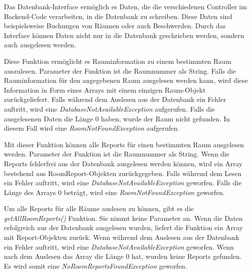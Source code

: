 

Das Datenbank-Interface ermöglich es Daten, die die verschiedenen Controller im Backend-Code verarbeiten, in die Datenbank zu schreiben. Diese Daten sind beispielsweise Buchungen von Räumen oder auch Beschwerden. Durch das Interface können Daten nicht nur in die Datenbank geschrieben werden, sondern auch ausgelesen werden.



Diese Funktion ermöglicht es Rauminformation zu einem bestimmten Raum auszulesen. Parameter der Funktion ist die Raumnummer als String. Falls die Rauminformation für den angegebenen Raum ausgelesen werden kann, wird diese Information in Form eines Arrays mit einem einzigen Raum-Objekt zurückgeliefert. Falls während dem Auslesen aus der Datenbank ein Fehler auftritt, wird eine \emph{DatabaseNotAvailableException} aufgerufen. Falls die ausgelesenen Daten die Länge 0 haben, wurde der Raum nicht gefunden. In diesem Fall wird eine \emph{RoomNotFoundException} aufgerufen.



Mit dieser Funktion können alle Reports für einen bestimmten Raum ausgelesen werden. Parameter der Funktion ist die Raumnummer als String. Wenn die Reports fehlerfrei aus der Datenbank ausgelesen werden können, wird ein Array bestehend aus RoomReport-Objekten zurückgegeben. Falls während dem Lesen ein Fehler auftritt, wird eine \emph{DatabaseNotAvailableException} geworfen. Falls die Länge des Arrays 0 beträgt, wird eine \emph{RoomNotFoundException} geworfen.


Um alle Reports für alle Räume auslesen zu können, gibt es die \emph{getAllRoomReports()} Funktion. Sie nimmt keine Parameter an. Wenn die Daten erfolgreich aus der Datenbank ausgelesen wurden, liefert die Funktion ein Array mit Report-Objekten zurück. Wenn während dem Auslesen aus der Datenbank ein Fehler auftritt, wird eine \emph{DatabaseNotAvailableException} geworfen. Wenn nach dem Auslesen das Array die Länge 0 hat, wurden keine Reports gefunden. Es wird somit eine \emph{NoRoomReportsFoundException} geworfen.

